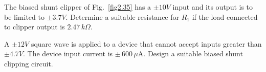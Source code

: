 \begin{example}\label{exam2.44}
The biased shunt clipper of Fig.~\ref{fig2.35} has a $\pm10V$ input and its output is to be limited to $\pm 3.7V$. Determine a suitable resistance for $R_{1}$ if the load connected to clipper output is $2.47\,k\Omega$.
\end{example}


\begin{example}\label{exam2.45}
A $\pm 12V$ square wave is applied to a device that cannot accept inputs greater than $\pm 4.7V$. The device input current is $\pm\, 600\,\mu\text{A}$. Design a suitable biased shunt clipping circuit.
\end{example}

